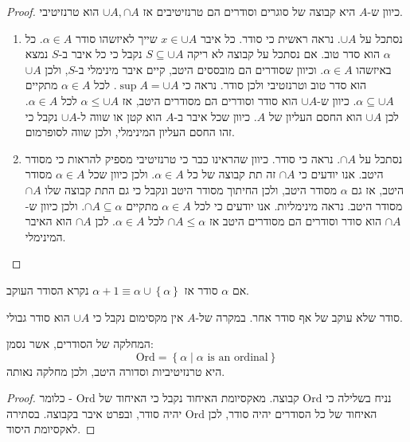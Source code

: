 \documentclass{tstextbook}
\begin{document}
\begin{proof}
כיוון ש-\(A\) היא קבוצה של סוגרים וסודרים הם טרנזיטיבים אז \(\cup A,\cap A\) הוא טרנזיטיבי.

  \begin{enumerate}
    \item נסתכל על \(\cup A\). נראה ראשית כי סודר. כל איבר \(x \in \cup A\) שייך לאיזשהו סודר \(\alpha \in A\). כל \(\alpha\) הוא סדר טוב. אם נסתכל על קבוצה לא ריקה \(S\subseteq \cup A\) נקבל כי כל איבר ב-\(S\) נמצא באיזשהו \(\alpha \in A\). וכיוון שסודרים הם מובססים היטב, קיים איבר מינימלי ב-\(S\), ולכן \(\cup A\) הוא סדר טוב וטרנזטיבי ולכן סודר. 
נראה כי \(\sup A = \cup A\). לכל \(\alpha \in A\) מתקיים \(\alpha \subseteq \cup A\). כיוון ש-\(\cup A\) הוא סודר וסודרים הם מסודרים היטב, אז \(\alpha \leq \cup A\) לכל \(\alpha \in A\). לכן \(\cup A\) הוא החסם העליון של \(A\). כיוון שכל איבר ב-\(A\) הוא קטן או שווה ל-\(\cup A\) נקבל כי זהו החסם העליון המינימלי, ולכן שווה לסופרמום.


    \item נסתכל על \(\cap A\). נראה כי סודר. כיוון שהראינו כבר כי טרנזיטיבי מספיק להראות כי מסודר היטב. אנו יודעים כי \(\cap A\) זה תת קבוצה של כל \(\alpha \in A\). ולכן כיוון שכל \(\alpha \in A\) מסודר היטב, אז גם \(\alpha\) מסודר היטב, ולכן החיתוך מסודר היטב ונקבל כי גם התת קבוצה שלו \(\cap A\) מסודר היטב. 
נראה מינימליות. אנו יודעים כי לכל \(\alpha \in A\) מתקיים \(\cap A\subseteq \alpha\). ולכן כיוון ש-\(\cap A\) הוא סודר וסודרים הם מסודרים היטב אז \(\cap A\leq \alpha\) לכל \(\alpha \in A\). לכן \(\cap A\) הוא האיבר המינימלי.


  \end{enumerate}
\end{proof}
\begin{definition}
אם \(\alpha\) סודר אז \(\alpha+1\equiv\alpha \cup \left\{  \alpha  \right\}\) נקרא הסודר העוקב.

\end{definition}
\begin{definition}
סודר שלא עוקב של אף סודר אחר. במקרה של-\(A\) אין מקסימום נקבל כי \(\cup A\) הוא סודר גבולי.

\end{definition}
\begin{proposition}
המחלקה של הסודרים, אשר נסמן:
$$\mathrm{Ord} = \left\{  \alpha \mid \alpha \text{ is an ordinal}  \right\}$$
היא טרנזיטיביות וסדורה היטב, ולכן מחלקה נאותה.

\end{proposition}
\begin{proof}
נניח בשלילה כי \(\mathrm{O rd}\) קבוצה. מאקסיומת האיחוד נקבל כי האיחוד של \(\mathrm{Ord}\) - כלומר האיחוד של כל הסודרים יהיה סודר, לכן \(\mathrm{Ord}\) יהיה סודר, ובפרט איבר בקבוצה. בסתירה לאקסיומת היסוד.

\end{proof}
\end{document}
